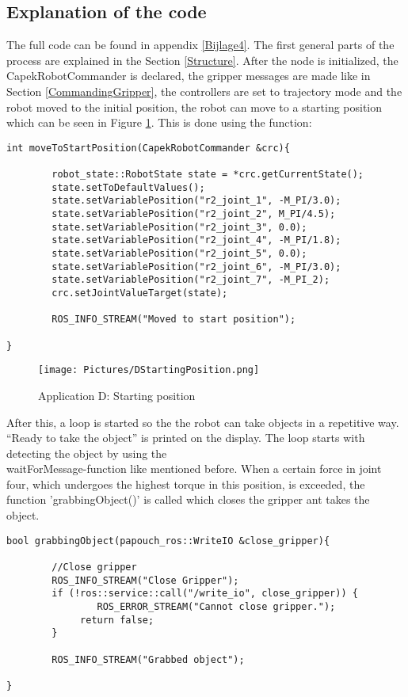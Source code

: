 \documentclass[11pt,a4paper]{report}
\begin{document}
\subsection{Explanation of the code}
The full code can be found in appendix \ref{Bijlage4}.
The first general parts of the process are explained in the Section \ref{Structure}.
After the node is initialized, the CapekRobotCommander is declared, the gripper messages are made like in Section \ref{CommandingGripper}, the controllers are set to trajectory mode and the robot moved to the initial position, the robot can move to a starting position which can be seen in Figure \ref{fig:DStartingPosition}. This is done using the function:
\begin{verbatim}
int moveToStartPosition(CapekRobotCommander &crc){

	    robot_state::RobotState state = *crc.getCurrentState();
	    state.setToDefaultValues();
	    state.setVariablePosition("r2_joint_1", -M_PI/3.0);
	    state.setVariablePosition("r2_joint_2", M_PI/4.5);
	    state.setVariablePosition("r2_joint_3", 0.0);
	    state.setVariablePosition("r2_joint_4", -M_PI/1.8);
	    state.setVariablePosition("r2_joint_5", 0.0);
	    state.setVariablePosition("r2_joint_6", -M_PI/3.0);
	    state.setVariablePosition("r2_joint_7", -M_PI_2);
	    crc.setJointValueTarget(state);

	    ROS_INFO_STREAM("Moved to start position");

}
\end{verbatim}
\begin{figure}[!ht]
	\centering
	\texttt{[image: Pictures/DStartingPosition.png]}
	\caption{Application D: Starting position}
	\label{fig:DStartingPosition}
\end{figure}
\newpage
After this, a loop is started so the the robot can take objects in a repetitive way. ``Ready to take the object'' is printed on the display. The loop starts with detecting the object by using the\\waitForMessage-function like mentioned before. When a certain force in joint four, which undergoes the highest torque in this position, is exceeded, the function 'grabbingObject()' is called which closes the gripper ant takes the object.
\begin{verbatim}
bool grabbingObject(papouch_ros::WriteIO &close_gripper){

	    //Close gripper
	    ROS_INFO_STREAM("Close Gripper");
	    if (!ros::service::call("/write_io", close_gripper)) {
       	    	ROS_ERROR_STREAM("Cannot close gripper.");
             return false;
	    }
	
	    ROS_INFO_STREAM("Grabbed object");
	
}
\end{verbatim}
\end{document}
